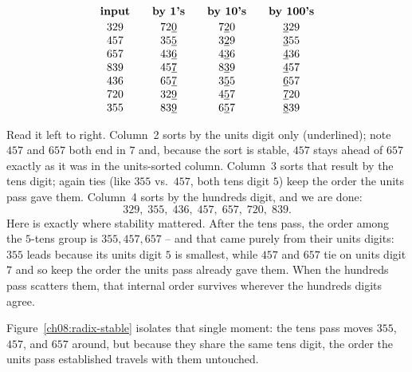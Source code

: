 \[
\begin{array}{c@{\qquad}c@{\qquad}c@{\qquad}c}
\textbf{input} & \textbf{by 1's} & \textbf{by 10's} & \textbf{by 100's}\\[2pt]
329 & 72\underline{0} & 7\underline{2}0 & \underline{3}29\\
457 & 35\underline{5} & 3\underline{2}9 & \underline{3}55\\
657 & 43\underline{6} & 4\underline{3}6 & \underline{4}36\\
839 & 45\underline{7} & 8\underline{3}9 & \underline{4}57\\
436 & 65\underline{7} & 3\underline{5}5 & \underline{6}57\\
720 & 32\underline{9} & 4\underline{5}7 & \underline{7}20\\
355 & 83\underline{9} & 6\underline{5}7 & \underline{8}39\\
\end{array}
\]

Read it left to right. Column~2 sorts by the units digit only (underlined);
note $457$ and $657$ both end in $7$ and, because the sort is stable, $457$
stays ahead of $657$ exactly as it was in the units-sorted column. Column~3
sorts that result by the tens digit; again ties (like $355$ vs.\ $457$, both
tens digit $5$) keep the order the units pass gave them. Column~4 sorts by the
hundreds digit, and we are done:
\[
329,\; 355,\; 436,\; 457,\; 657,\; 720,\; 839.
\]
Here is exactly where stability mattered. After the tens pass, the
order among the $5$-tens group is $355, 457, 657$ -- and that came purely from
their units digits: $355$ leads because its units digit $5$ is smallest, while
$457$ and $657$ tie on units digit $7$ and so keep the order the units pass
already gave them. When the hundreds pass scatters them, that internal order
survives wherever the hundreds digits agree.

Figure~\ref{ch08:radix-stable} isolates that single moment: the tens pass moves
$355$, $457$, and $657$ around, but because they share the same tens digit, the
order the units pass established travels with them untouched.

